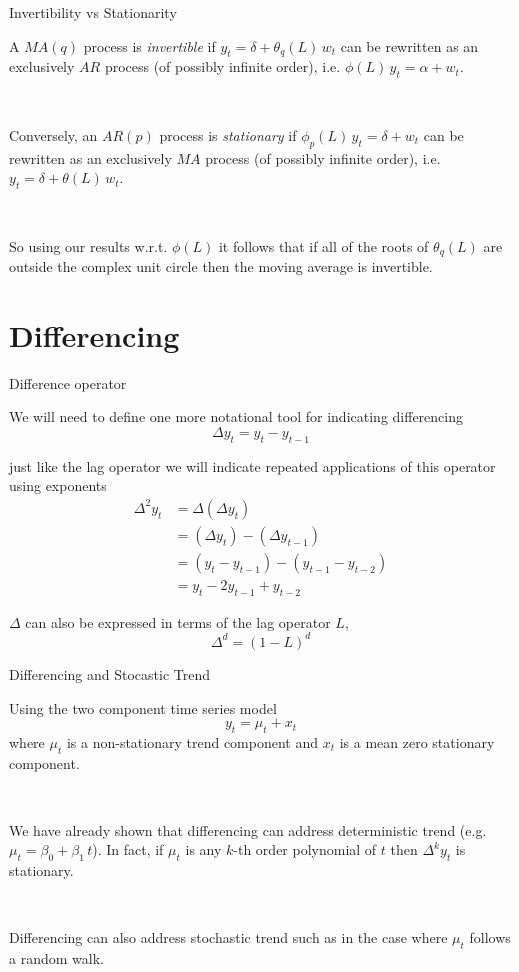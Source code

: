 \documentclass[11pt,ignorenonframetext,]{beamer}
\begin{document}
\begin{frame}[t]{Invertibility vs Stationarity}

A \(MA(q)\) process is \emph{invertible} if
\(y_t = \delta + \theta_q(L) \, w_t\) can be rewritten as an exclusively
\(AR\) process (of possibly infinite order), i.e.
\(\phi(L) \, y_t = \alpha + w_t\).

\(~\)

\pause

Conversely, an \(AR(p)\) process is \emph{stationary} if
\(\phi_p(L) \, y_t = \delta + w_t\) can be rewritten as an exclusively
\(MA\) process (of possibly infinite order), i.e.
\(y_t = \delta + \theta(L) \, w_t\).

\(~\)

\pause

So using our results w.r.t. \(\phi(L)\) it follows that if all of the
roots of \(\theta_q(L)\) are outside the complex unit circle then the
moving average is invertible.

\end{frame}

\section{Differencing}\label{differencing}

\begin{frame}{Difference operator}

We will need to define one more notational tool for indicating
differencing \[ \Delta y_t = y_t - y_{t-1} \]

just like the lag operator we will indicate repeated applications of
this operator using exponents \[ 
\begin{aligned}
\Delta^2 y_t 
  &= \Delta (\Delta y_t) \\
  &= (\Delta y_t) - (\Delta y_{t-1}) \\
  &= (y_t - y_{t-1}) - (y_{t-1} - y_{t-2}) \\
  &= y_t - 2y_{t-1}+y_{t-2}
\end{aligned}
\]

\(\Delta\) can also be expressed in terms of the lag operator \(L\),
\[ \Delta^d = (1-L)^d \]

\end{frame}

\begin{frame}[t]{Differencing and Stocastic Trend}

Using the two component time series model \[ y_t = \mu_t + x_t \] where
\(\mu_t\) is a non-stationary trend component and \(x_t\) is a mean zero
stationary component.

\(~\)

We have already shown that differencing can address deterministic trend
(e.g. \(\mu_t = \beta_0+\beta_1 \, t\)). In fact, if \(\mu_t\) is any
\(k\)-th order polynomial of \(t\) then \(\Delta^k y_t\) is stationary.

\(~\)

Differencing can also address stochastic trend such as in the case where
\(\mu_t\) follows a random walk.

\end{frame}
\end{document}
